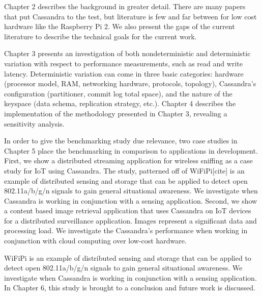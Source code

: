 Chapter 2 describes the background in greater detail. There are many papers that put Cassandra to the test, but literature is few and far between for low cost hardware like the Raspberry Pi 2. We also present the gaps of the current literature to describe the technical goals for the current work.
	
Chapter 3 presents an investigation of both nondeterministic and deterministic variation with respect to performance measurements, such as read and write latency.  Deterministic variation can come in three basic categories: hardware (processor model, RAM, networking hardware, protocols, topology), Cassandra’s configuration (partitioner, commit log total space), and the nature of the keyspace (data schema, replication strategy, etc.). Chapter 4 describes the implementation of the methodology presented in Chapter 3, revealing a sensitivity analysis.  
	
In order to give the benchmarking study due relevance, two case studies in Chapter 5 place the benchmarking in comparison to applications in development.  First, we show a distributed streaming application for wireless sniffing as a case study for IoT using Cassandra. The study, patterned off of WiFiPi[cite] is an example of distributed sensing and storage that can be applied to detect open 802.11a/b/g/n signals to gain general situational awareness.  We investigate when Cassandra is working in conjunction with a sensing application.  Second, we show a content based image retrieval application that uses Cassandra on IoT devices for a distributed surveillance application. Images represent a significant data and processing load.  We investigate the Cassandra’s performance when working in conjunction with cloud computing over low-cost hardware. 
	
WiFiPi is an example of distributed sensing and storage that can be applied to detect open 802.11a/b/g/n signals to gain general situational awareness.  We investigate when Cassandra is working in conjunction with a sensing application.
In Chapter 6, this study is brought to a conclusion and future work is discussed.






